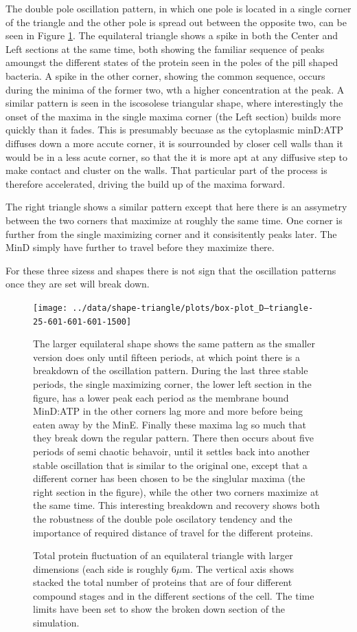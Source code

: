 \documentclass[letterpaper,twocolumn,amsmath,amssymb,pre]{revtex4-1}
\newcommand\micron{\ensuremath{\mu\text{m}}}
\begin{document}
The double pole oscillation pattern, in which one pole is located in a
single corner of the triangle and the other pole is spread out between
the opposite two, can be seen in Figure \ref{box-triangle}.  The
equilateral triangle shows a spike in both the Center and Left
sections at the same time, both showing the familiar sequence of peaks
amoungst the different states of the protein seen in the poles of the
pill shaped bacteria.  A spike in the other corner, showing the common
sequence, occurs during the minima of the former two, wth a higher
concentration at the peak.  A similar pattern is seen in the
iscosolese triangular shape, where interestingly the onset of the
maxima in the single maxima corner (the Left section) builds more
quickly than it fades.  This is presumably becuase as the cytoplasmic
minD:ATP diffuses down a more accute corner, it is sourrounded by
closer cell walls than it would be in a less acute corner, so that the
it is more apt at any diffusive step to make contact and cluster on
the walls.  That particular part of the process is therefore
accelerated, driving the build up of the maxima forward.

The right triangle shows a similar pattern except that here there is
an assymetry between the two corners that maximize at roughly the same
time.  One corner is further from the single maximizing corner and it
consisitently peaks later.  The MinD simply have further to travel
before they maximize there.

For these three sizess and shapes there is not sign that the
oscillation patterns once they are set will break down.

\begin{figure}
  \texttt{[image: ../data/shape-triangle/plots/box-plot\_D--triangle-25-601-601-601-1500]}
  \caption{Total protein fluctuation of an equilateral triangle with
    larger dimensions (each side is roughly $6\micron$.  The vertical
    axis shows stacked the total number of proteins that are of four
    different compound stages and in the different sections of the
    cell. The time limits have been set to show the broken down
    section of the simulation.}
  \label{box-triangle}

The larger equilateral shape shows the same pattern as the smaller
version does only until fifteen periods, at which point there is a
breakdown of the oscillation pattern.  During the last three stable
periods, the single maximizing corner, the lower left section in the
figure, has a lower peak each period as the membrane bound MinD:ATP in
the other corners lag more and more before being eaten away by the
MinE.  Finally these maxima lag so much that they break down the
regular pattern.  There then occurs about five periods of semi chaotic
behavoir, until it settles back into another stable oscillation that
is similar to the original one, except that a different corner has
been chosen to be the singlular maxima (the right section in the
figure), while the other two corners maximize at the same time.  This
interesting breakdown and recovery shows both the robustness of the
double pole oscilatory tendency and the importance of required
distance of travel for the different proteins.

\end{figure}
\end{document}
